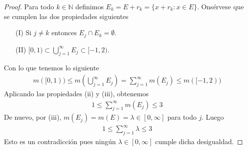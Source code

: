 \begin{proof}
    Para todo $k \in \mathbb{N}$ definimos $E_k = E + r_k = \{x + r_k : x \in E \}$. Onsérvese que se cumplen las dos propiedades siguientes
    \begin{enumerate}
        \item[(I)] Si $j \not = k$ entonces $E_j \cap E_k = \emptyset$.
        \item[(II)] $[0,1) \subset \bigcup_{j=1}^{\infty}{E_j} \subset [-1,2)$.
    \end{enumerate}
    Con lo que tenemos lo siguiente
    \begin{align*}
        m([0,1)) \leq m\left( \bigcup_{j=1}^{\infty}{E_j} \right) = \sum_{j=1}^{\infty}{m(E_j)} \leq m([-1,2))
    \end{align*}
    Aplicando las propiedades (ii) y (iii), obtenemos
    \begin{align*}
        1 \leq \sum_{j=1}^{\infty}{m(E_j)} \leq 3
    \end{align*}
    De nuevo, por (iii), $m(E_j) = m(E) = \lambda \in [0,\infty]$ para todo $j$. Luego
    \begin{align*}
        1 \leq \sum_{j=1}^{\infty}{\lambda} \leq 3
    \end{align*}
    Esto es un contradicción pues ningún $\lambda \in [0,\infty]$ cumple dicha desigualdad.
\end{proof}

